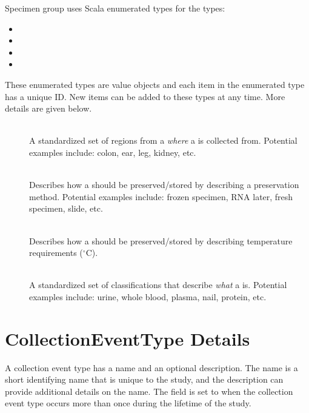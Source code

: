 Specimen group uses Scala enumerated types for the types:

\begin{itemize}
\item {}
\item {}
\item {}
\item {}
\end{itemize}

These enumerated types are value objects and each item in the enumerated type has a unique ID. New
items can be added to these types at any time. More details are given below.

\begin{description}

\item[] \hfill \\ A standardized set of regions from a 
\emph{where} a  is collected from. Potential examples include: colon, ear, leg,
kidney, etc.

\item[] \hfill \\  Describes how a  should be preserved/stored by
describing a preservation method. Potential examples include: frozen specimen, RNA later, fresh
specimen, slide, etc.

\item[] \hfill \\  Describes how a  should be
preserved/stored by describing temperature requirements ($^\circ$C).

\item[] \hfill \\  A standardized set of classifications that describe \emph{what} a
 is. Potential examples include: urine, whole blood, plasma, nail, protein,
etc.

\end{description}

\clearpage
\section{CollectionEventType Details}
\label{sec:collection-event-type}
A collection event type has a name and an optional description. The name is a
short identifying name that is unique to the study, and the description can
provide additional details on the name. The  field is set to
 when the collection event type occurs more than once during the
lifetime of the study.


